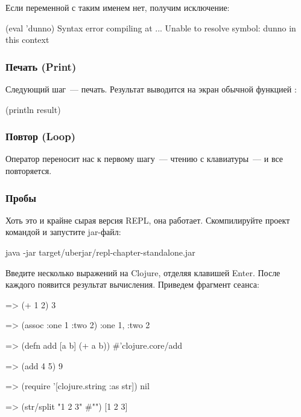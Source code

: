 Если переменной с таким именем нет, получим исключение:

\begin{english}
  \begin{clojure}
(eval 'dunno)
Syntax error compiling at ...
Unable to resolve symbol: dunno in this context
  \end{clojure}
\end{english}

\subsubsection{Печать (Print)}

Следующий шаг~--- печать. Результат  выводится на экран обычной функцией :

\begin{english}
  \begin{clojure}
(println result)
  \end{clojure}
\end{english}

\subsubsection{Повтор (Loop)}

Оператор  переносит нас к первому шагу~--- чтению с клавиатуры~--- и все повторяется.

\subsubsection{Пробы}

Хоть это и крайне сырая версия REPL, она работает. Скомпилируйте проект командой  и запустите jar-файл:

\begin{english}
  \begin{clojure}
java -jar target/uberjar/repl-chapter-standalone.jar
  \end{clojure}
\end{english}

Введите несколько выражений на Clojure, отделяя клавишей Enter. После каждого появится результат вычисления. Приведем фрагмент сеанса:

\begin{english}
  \begin{clojure}
=> (+ 1 2)
3

=> (assoc {:one 1} :two 2)
{:one 1, :two 2}

=> (defn add [a b] (+ a b))
#'clojure.core/add

=> (add 4 5)
9

=> (require '[clojure.string :as str])
nil

=> (str/split "1 2 3" #"\s")
[1 2 3]
  \end{clojure}
\end{english}

